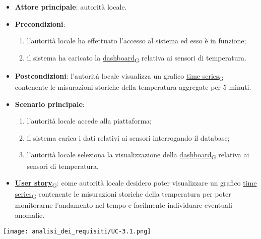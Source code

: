 \begin{itemize}
	\item \textbf{Attore principale}: autorità locale.
	\item \textbf{Precondizioni}:
	      \begin{enumerate}
		      \item l'autorità locale ha effettuato l'accesso al sistema ed esso è in funzione;
		      \item il sistema ha caricato la \href{https://7last.github.io/docs/pb/documentazione-interna/glossario\#dashboard}{dashboard\textsubscript{G}} relativa ai sensori di temperatura.
	      \end{enumerate}
	\item \textbf{Postcondizioni}: l'autorità locale visualizza un grafico \href{https://7last.github.io/docs/pb/documentazione-interna/glossario\#time-series}{time series\textsubscript{G}} contenente le misurazioni storiche
	      della temperatura aggregate per 5 minuti.
	\item \textbf{Scenario principale}:
	      \begin{enumerate}
		      \item l'autorità locale accede alla piattaforma;
		      \item il sistema carica i dati relativi ai sensori interrogando il database;
		      \item l'autorità locale seleziona la visualizzazione della \href{https://7last.github.io/docs/pb/documentazione-interna/glossario\#dashboard}{dashboard\textsubscript{G}} relativa ai sensori di temperatura.
	      \end{enumerate}
	\item \href{https://7last.github.io/docs/pb/documentazione-interna/glossario\#user-story}{\textbf{User story}\textsubscript{G}}: come autorità locale desidero poter visualizzare un grafico \href{https://7last.github.io/docs/pb/documentazione-interna/glossario\#time-series}{time series\textsubscript{G}} contenente le misurazioni storiche della temperatura
	      per poter monitorarne l'andamento nel tempo e facilmente individuare eventuali anomalie.
\end{itemize}
\begin{center}
	\texttt{[image: analisi\_dei\_requisiti/UC-3.1.png]}
\end{center}


